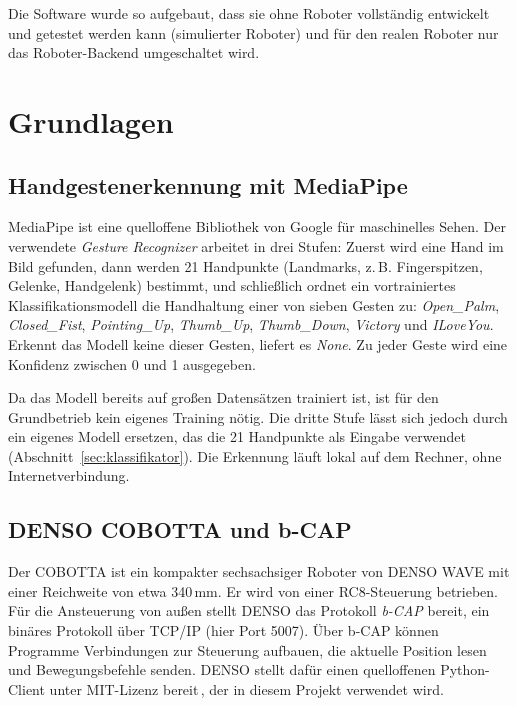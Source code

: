 \documentclass[11pt,a4paper]{article}
\begin{document}
Die Software wurde so aufgebaut, dass sie ohne Roboter vollständig entwickelt und getestet werden
kann (simulierter Roboter) und für den realen Roboter nur das Roboter-Backend umgeschaltet wird.

\section{Grundlagen}

\subsection{Handgestenerkennung mit MediaPipe}

MediaPipe ist eine quelloffene Bibliothek von Google für maschinelles Sehen. Der verwendete
\emph{Gesture Recognizer} arbeitet in drei Stufen: Zuerst wird eine Hand im Bild gefunden, dann
werden 21 Handpunkte (Landmarks, z.\,B. Fingerspitzen, Gelenke, Handgelenk) bestimmt, und
schließlich ordnet ein vortrainiertes Klassifikationsmodell die Handhaltung einer von sieben Gesten
zu: \emph{Open\_Palm}, \emph{Closed\_Fist}, \emph{Pointing\_Up}, \emph{Thumb\_Up},
\emph{Thumb\_Down}, \emph{Victory} und \emph{ILoveYou}. Erkennt das Modell keine dieser Gesten,
liefert es \emph{None}. Zu jeder Geste wird eine Konfidenz zwischen 0 und 1 ausgegeben.

Da das Modell bereits auf großen Datensätzen trainiert ist, ist für den Grundbetrieb kein eigenes
Training nötig. Die dritte Stufe lässt sich jedoch durch ein eigenes Modell ersetzen, das die
21 Handpunkte als Eingabe verwendet (Abschnitt~\ref{sec:klassifikator}). Die Erkennung läuft
lokal auf dem Rechner, ohne Internetverbindung.

\subsection{DENSO COBOTTA und b-CAP}

Der COBOTTA ist ein kompakter sechsachsiger Roboter von DENSO WAVE mit einer Reichweite von etwa
340\,mm. Er wird von einer RC8-Steuerung betrieben. Für die Ansteuerung von außen stellt DENSO das
Protokoll \emph{b-CAP} bereit, ein binäres Protokoll über TCP/IP (hier Port 5007). Über b-CAP
können Programme Verbindungen zur Steuerung aufbauen, die aktuelle Position lesen und
Bewegungsbefehle senden. DENSO stellt dafür einen quelloffenen Python-Client unter MIT-Lizenz
bereit\,\cite{orinbcap}, der in diesem Projekt verwendet wird.
\end{document}
